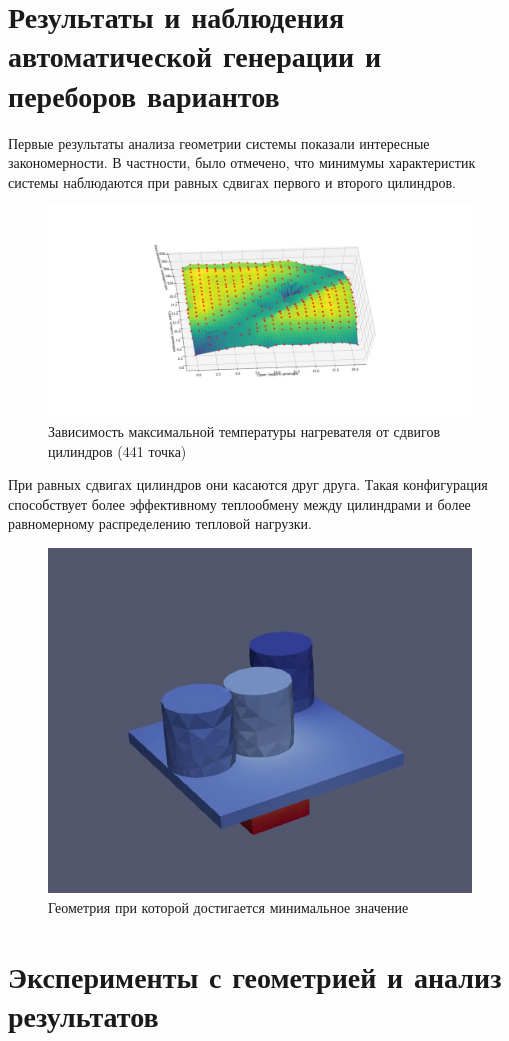 \documentclass[a4paper,12pt]{extreport}
\numberwithin{equation}{chapter}
\begin{document}
\section{Результаты и наблюдения автоматической генерации и переборов вариантов}

Первые результаты анализа геометрии системы показали интересные закономерности. В частности, было отмечено, что минимумы характеристик системы наблюдаются при равных сдвигах первого и второго цилиндров.

\begin{figure}[h]
	\begin{center}
		\includegraphics[width=0.4\linewidth]{images/18.3.jpg}
		\caption{Зависимость максимальной температуры нагревателя от сдвигов цилиндров (441 точка)} %
	\end{center}
\end{figure}

При равных сдвигах цилиндров они касаются друг друга. Такая конфигурация способствует более эффективному теплообмену между цилиндрами и более равномерному распределению тепловой нагрузки.

\begin{figure}[h]
	\begin{center}
		\includegraphics[width=0.4\linewidth]{images/19.jpg}
		\caption{Геометрия при которой достигается минимальное значение} %
	\end{center}
\end{figure}

\section{Эксперименты с геометрией и анализ результатов}
\end{document}

